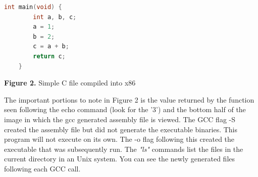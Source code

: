 \documentclass[paper=a4, fontsize=11pt]{scrartcl}
\numberwithin{equation}{section}		%
\numberwithin{figure}{section}			%
\numberwithin{table}{section}			%
\begin{document}
\begin{framed}
	\begin{lstlisting}[language=C++,
	                   directivestyle={\color{black}}
        	            emph={int,char,double,float,unsigned},
                	     emphstyle={\color{blue}}
                	    ]
	int main(void) {
		int a, b, c;
		a = 1;
		b = 2;
		c = a + b;
		return c;
	}	
	\end{lstlisting}
\end{framed}

\newpage

\vskip 0.05in
\centerline{\textbf{Figure 2. }Simple C file compiled into x86}
\vskip 0.1in

The important portions to note in Figure 2 is the value returned by the function seen following the echo command (look for the '3') and the bottom half of the image in which the gcc generated assembly file is viewed. The GCC flag -S created the assembly file but did not generate the executable binaries. This program will not execute on its own. The -o flag following this created the executable that was subsequently run. The \textit{"ls"} commands list the files in the current directory in an Unix system. You can see the newly generated files following each GCC call.
\end{document}

